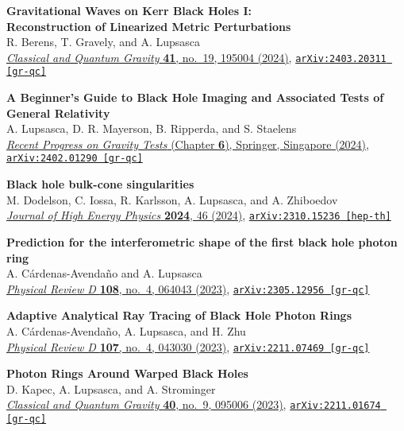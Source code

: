 \documentclass[margin,line]{resume}
\begin{document}
\begin{resume}
\textbf{Gravitational Waves on Kerr Black Holes I:}\\
\textbf{Reconstruction of Linearized Metric Perturbations} \\
R. Berens, T. Gravely, and A. Lupsasca \\
\href{https://doi.org/10.1088/1361-6382/ad6c9c}{\textit{Classical and Quantum Gravity} \textbf{41}, no.~19, 195004 (2024)}, \texttt{\href{https://arxiv.org/abs/2403.20311}{arXiv:2403.20311 [gr-qc]}}

\textbf{A Beginner's Guide to Black Hole Imaging and Associated Tests of General Relativity} \\
A. Lupsasca, D. R. Mayerson, B. Ripperda, and S. Staelens \\
\href{https://doi.org/10.1007/978-981-97-2871-8_6}{\textit{Recent Progress on Gravity Tests} (Chapter \textbf{6}), Springer, Singapore (2024)}, \texttt{\href{https://arxiv.org/abs/2402.01290}{arXiv:2402.01290 [gr-qc]}}

\textbf{Black hole bulk-cone singularities} \\
M. Dodelson, C. Iossa, R. Karlsson, A. Lupsasca, and A. Zhiboedov \\
\href{https://doi.org/10.1007/JHEP07(2024)046}{\textit{Journal of High Energy Physics} \textbf{2024}, 46 (2024)}, \texttt{\href{https://arxiv.org/abs/2310.15236}{arXiv:2310.15236 [hep-th]}}

\clearpage

\textbf{Prediction for the interferometric shape of the first black hole photon ring} \\
A. C\'ardenas-Avenda\~no and A. Lupsasca \\
\href{https://doi.org/10.1103/PhysRevD.108.064043}{\textit{Physical Review D} \textbf{108}, no.~4, 064043 (2023)}, \texttt{\href{https://arxiv.org/abs/2305.12956}{arXiv:2305.12956 [gr-qc]}}

\textbf{Adaptive Analytical Ray Tracing of Black Hole Photon Rings} \\
A. C\'ardenas-Avenda\~no, A. Lupsasca, and H. Zhu \\
\href{https://doi.org/10.1103/PhysRevD.107.043030}{\textit{Physical Review D} \textbf{107}, no.~4, 043030 (2023)}, \texttt{\href{https://arxiv.org/abs/2211.07469}{arXiv:2211.07469 [gr-qc]}}

\textbf{Photon Rings Around Warped Black Holes} \\
D. Kapec, A. Lupsasca, and A. Strominger \\
\href{https://doi.org/10.1088/1361-6382/acc164}{\textit{Classical and Quantum Gravity} \textbf{40}, no.~9, 095006 (2023)}, \texttt{\href{https://arxiv.org/abs/2211.01674}{arXiv:2211.01674 [gr-qc]}}


\end{resume}
\end{document}
